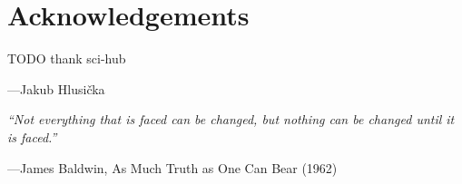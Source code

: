 \chapter*{Acknowledgements}
TODO
thank sci-hub

\begin{flushright}
---Jakub Hlusička
\end{flushright}

\vfill
\begin{center}
{\large
\textit{``Not everything that is faced can be changed, but nothing can be changed until it is faced.''}
}
\end{center}
\begin{flushright}
    ---James Baldwin, As Much Truth as One Can Bear (1962)
\end{flushright}
